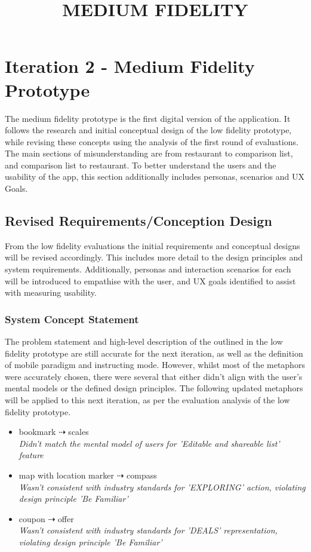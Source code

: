 \documentclass[a4 paper, 12pt]{article}
\title{MEDIUM FIDELITY}
\begin{document}
\section{Iteration 2 - Medium Fidelity Prototype}
The medium fidelity prototype is the first digital version of the application. It follows the research and initial conceptual design of the low fidelity prototype, while revising these concepts using the analysis of the first round of evaluations. The main sections of misunderstanding are from restaurant to comparison list, and comparison list to restaurant. To better understand the users and the usability of the app, this section additionally includes personas, scenarios and UX Goals. 


\subsection{Revised Requirements/Conception Design}
From the low fidelity evaluations the initial requirements and conceptual designs will be revised accordingly. This includes more detail to the design principles and system requirements. Additionally, personas and interaction scenarios for each will be introduced to empathise with the user, and UX goals identified to assist with measuring usability.

    \subsubsection{System Concept Statement}
    The problem statement and high-level description of the outlined in the low fidelity prototype are still accurate for the next iteration, as well as the definition of mobile paradigm and instructing mode. However, whilst most of the metaphors were accurately chosen, there were several that either didn't align with the user's mental models or the defined design principles. The following updated metaphors will be applied to this next iteration, as per the evaluation analysis of the low fidelity prototype.
        \begin{itemize}
            \item bookmark $\dashrightarrow$ scales \\
            \textit{Didn't match the mental model of users for 'Editable and shareable list' feature}
            \item map with location marker $\dashrightarrow$ compass \\
            \textit{Wasn't consistent with industry standards for 'EXPLORING' action, violating design principle 'Be Familiar'}            
            \item coupon $\dashrightarrow$ offer \\
            \textit{Wasn't consistent with industry standards for 'DEALS' representation, violating design principle 'Be Familiar'} 
        \end{itemize}
\end{document}
